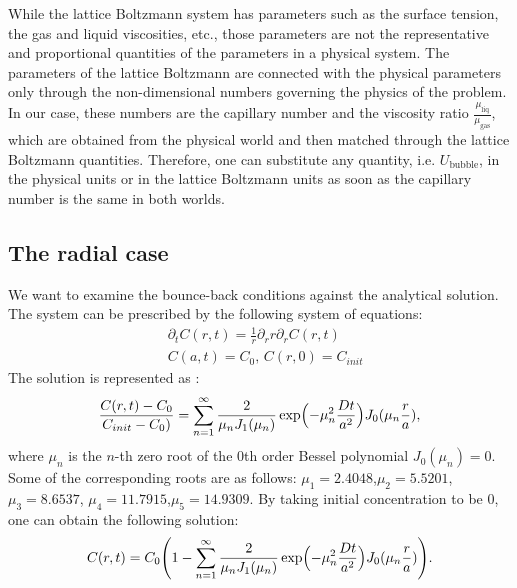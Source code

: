 \documentclass{article}
\newcommand{\beq}{\begin{equation}}
\newcommand{\feq}{\end{equation}}
\begin{document}
{\color{red}
While the lattice Boltzmann system has parameters such as the surface tension, the gas and liquid
viscosities, etc., those parameters are not the representative and
proportional quantities of the parameters in a physical system. The parameters of the lattice
Boltzmann are connected with the physical parameters only through the non-dimensional
numbers governing the physics of the problem. In our case, these numbers are the capillary number
and the
viscosity ratio $\frac{\mu_{\mathrm{liq}}}{\mu_{\mathrm{gas}}}$, which are
obtained from the physical world and then matched through the lattice Boltzmann quantities.
Therefore, one can substitute any quantity, i.e.
$U_{\mathrm{bubble}}$, in the physical units or in the lattice Boltzmann units as soon as the
capillary number is the same in both worlds.} 


\subsection{The radial case}
We want to examine the bounce-back conditions against the analytical solution. The system can be
prescribed by the following system of equations:
\beq
\begin{aligned}
&\partial_t C(r,t)=\frac{1}{r}\partial_r r \partial_r C(r,t)\\
&C(a,t)=C_0,\,C(r,0)=C_{init}
\end{aligned}
\feq 
The solution is represented as \cite{chemical-correlations}:
\beq
\frac{C(r,t)-C_{0}}{C_{init}-C_{0})}=\sum_{n=1}^{\infty}{\frac{2}{\mu_n
J_1(\mu_n)}\exp\Bigl(-\mu_n^2 \frac{D t}{a^2} \Bigr)J_0(\mu_n \frac{r}{a})},
\feq
where $\mu_n$ is the $n$-th zero root of the $0$th order Bessel polynomial $J_0(\mu_n)=0$. Some of
the corresponding roots are as follows: $\mu_1=2.4048$,$\mu_2=5.5201$,$\mu_3=8.6537$,
$\mu_4=11.7915$,$\mu_5=14.9309$.
By taking initial concentration to be $0$, one can obtain the following solution:
\beq
C(r,t)=C_0 \Biggl(1 - \sum_{n=1}^{\infty}{\frac{2}{\mu_n
J_1(\mu_n)}\exp\Bigl(-\mu_n^2 \frac{D t}{a^2} \Bigr)J_0(\mu_n \frac{r}{a})}\Biggr).
\feq
\end{document}
